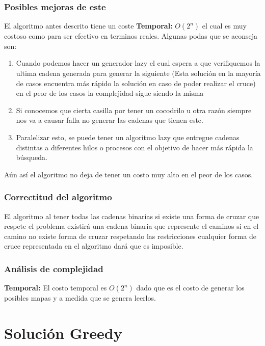 \documentclass{article}
\begin{document}
\subsubsection{Posibles mejoras de este}
El algoritmo antes descrito tiene un coste \textbf{Temporal:} $O(2^n)$ el cual es muy costoso como para ser efectivo en 
terminos reales.
Algunas podas que se aconseja son:
\begin{enumerate}
    \item Cuando podemos hacer un generador lazy el cual espera a que verifiquemos la ultima cadena generada para generar la siguiente
    (Esta solución en la mayoría de casos encuentra más rápido la solución en caso de poder realizar el cruce) en el peor de los casos la complejidad sigue siendo la misma
    \item Si conocemos que cierta casilla por tener un cocodrilo u otra razón siempre nos va a causar falla no generar las cadenas que tienen este.
    \item Paralelizar esto, se puede tener un algoritmo lazy que entregue cadenas distintas a diferentes hilos o procesos con el objetivo de hacer más rápida la búsqueda.
\end{enumerate}
Aún así el algoritmo no deja de tener un costo muy alto en el peor de los casos.
\subsubsection{Correctitud del algoritmo}
El algoritmo al tener todas las cadenas binarias si existe una forma de cruzar que respete el problema existirá una cadena binaria que represente el caminos
si en el camino no existe forma de cruzar respetando las restricciones cualquier forma de cruce representada en el algoritmo dará que es imposible.
\subsubsection{Análisis de complejidad}
\textbf{Temporal:} El costo temporal es $O(2^n)$ dado que es el costo de generar los posibles mapas y a medida que se genera leerlos.

\section{Solución Greedy}
\end{document}
